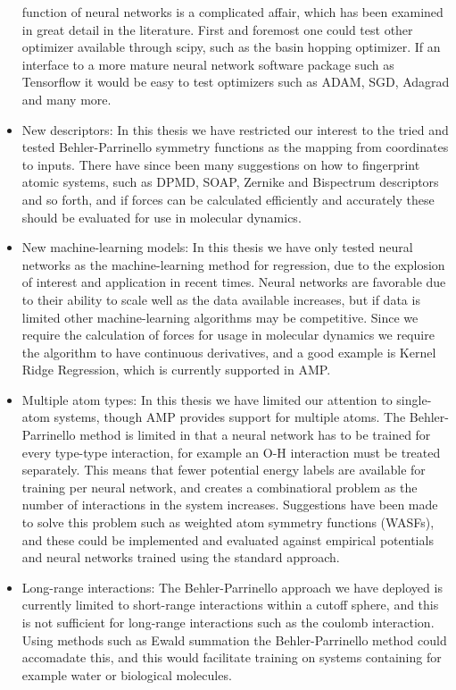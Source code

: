 \begin{itemize}
        function of neural networks is a complicated affair, which has
        been examined in great detail in the literature.
        First and foremost one could test other optimizer available
        through scipy, such as the basin hopping optimizer.
        If an interface to a more mature neural network software package
        such as Tensorflow it would be easy to test optimizers such as 
        ADAM, SGD, Adagrad and many more.
    \item New descriptors:
        In this thesis we have restricted our interest to the tried and tested
        Behler-Parrinello symmetry functions as the mapping from
        coordinates to inputs. There have since been many suggestions
        on how to fingerprint atomic systems, such as DPMD, SOAP,
        Zernike and Bispectrum descriptors and so forth,
        and if forces can be calculated efficiently and accurately
        these should be evaluated for use in molecular dynamics.
    \item New machine-learning models:
        In this thesis we have only tested neural networks as the
        machine-learning method for regression, due to the
        explosion of interest and application in recent times.
        Neural networks are favorable due to their ability to scale
        well as the data available increases, but if data is limited
        other machine-learning algorithms may be competitive.
        Since we require the calculation of forces for usage
        in molecular dynamics we require the algorithm to have
        continuous derivatives, and a good example is Kernel Ridge
        Regression, which is currently supported in AMP.
    \item Multiple atom types:
        In this thesis we have limited our attention to single-atom
        systems, though AMP provides support for multiple atoms.
        The Behler-Parrinello method is limited in that a neural network
        has to be trained for every type-type interaction, for example
        an O-H interaction must be treated separately. This means that
        fewer potential energy labels are available for training per neural
        network, and creates a combinatioral problem as the number of interactions
        in the system increases. Suggestions have been made to solve this
        problem such as weighted atom symmetry functions (WASFs),
        and these could be implemented and evaluated against
        empirical potentials and neural networks trained using the standard
        approach.
    \item Long-range interactions:
        The Behler-Parrinello approach we have deployed is currently
        limited to short-range interactions within a cutoff sphere,
        and this is not sufficient for long-range interactions such
        as the coulomb interaction. Using methods such as Ewald summation
        the Behler-Parrinello method could accomadate this, and this
        would facilitate training on systems containing for example
        water or biological molecules.
\end{itemize}

